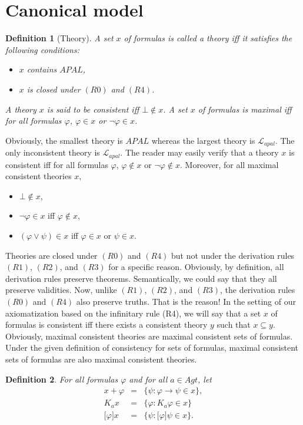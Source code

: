 \documentclass{article}[12pt]
\newtheorem{definition}{Definition}
\renewcommand{\phi}{\varphi}
\begin{document}
\section{Canonical model}
\begin{definition}[Theory]
A set $x$ of formulas is called a theory iff it satisfies the following conditions:
\begin{itemize}
\item $x$ contains $APAL$,
\item $x$ is closed under $(R0)$ and $(R4)$.
\end{itemize}
A theory $x$ is said to be {\em consistent} iff $\bot\not\in x$.
A set $x$ of formulas is {\em maximal} iff for all formulas $\phi$, $\phi\in x$ or $\neg\phi\in x$. 
\end{definition}
Obviously, the smallest theory is $APAL$ whereas the largest theory is $\mathcal{L}_{apal}$.
The only inconsistent theory is $\mathcal{L}_{apal}$.
The reader may easily verify that a theory $x$ is consistent iff for all formulas $\phi$, $\phi\not\in x$ or $\neg\phi\not\in x$.
Moreover, for all maximal consistent theories $x$,
\begin{itemize}
\item $\bot\not\in x$,
\item $\neg\phi\in x$ iff $\phi\not\in x$,
\item $(\phi\vee\psi)\in x$ iff $\phi\in x$ or $\psi\in x$.
\end{itemize}
Theories are closed under $(R0)$ and $(R4)$ but not under the derivation rules $(R1)$, $(R2)$, and $(R3)$ for a specific reason. Obviously, by definition, all derivation rules preserve theorems. Semantically, we could say that they all preserve validities. Now, unlike $(R1)$, $(R2)$, and $(R3)$, the derivation rules $(R0)$ and $(R4)$ also preserve truths. That is the reason!
In the setting of our axiomatization based on the infinitary rule (R4), we will say that a set $x$ of formulas is consistent iff there exists a consistent theory $y$ such that $x\subseteq y$.
Obviously, maximal consistent theories are maximal consistent sets of formulas. Under the given definition of consistency for sets of formulas, maximal consistent sets of formulas are also maximal consistent theories.
\begin{definition}
For all formulas $\phi$ and for all $a\in Agt$, let \[\begin{array}{lll} x+\phi &=&\{\psi : \phi\rightarrow\psi\in x\}, \\ K_{a}x &=& \{\phi: K_{a}\phi\in x\} \\ \lbrack\phi\rbrack x &=& \{\psi: \lbrack\phi\rbrack\psi\in x\}.  \end{array} \]
\end{definition}
\end{document}
